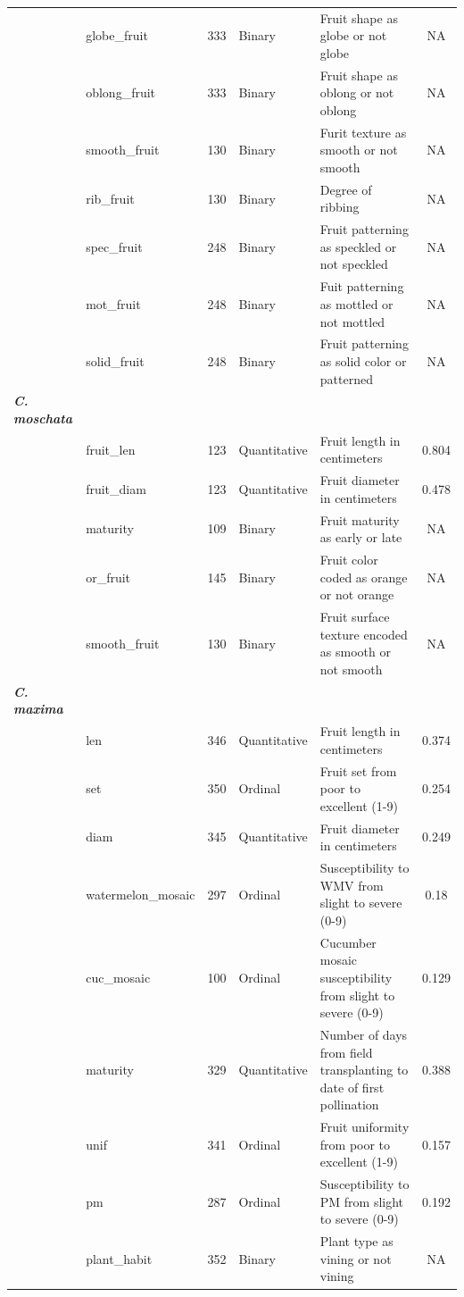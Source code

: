 \documentclass[utf8]{FrontiersinHarvard} %
\begin{document}
\begin{center}
\begin{longtable}{l l l l p{5cm} c}
& globe\_fruit & 333 &Binary & Fruit shape as globe or not globe & NA\\
& oblong\_fruit & 333&Binary & Fruit shape as oblong or not oblong & NA\\
& smooth\_fruit & 130 &Binary & Furit texture as smooth or not smooth & NA\\
& rib\_fruit & 130 &Binary & Degree of ribbing & NA \\
& spec\_fruit & 248 &Binary & Fruit patterning as speckled or not speckled & NA \\
& mot\_fruit & 248 & Binary & Fuit patterning as mottled or not mottled & NA \\
& solid\_fruit & 248& Binary & Fruit patterning as solid color or patterned & NA \\
\textbf{\emph{C. moschata}} & && & &\\
& fruit\_len & 123&Quantitative & Fruit length in centimeters & 0.804 \\
& fruit\_diam &123 &Quantitative & Fruit diameter in centimeters & 0.478 \\
& maturity & 109&Binary & Fruit maturity as early or late & NA \\
& or\_fruit & 145&Binary & Fruit color coded as orange or not orange & NA \\
& smooth\_fruit & 130 &Binary & Fruit surface texture encoded as smooth or not smooth & NA \\
\textbf{\emph{C. maxima}}& & & & &\\
& len & 346 &Quantitative & Fruit length in centimeters & 0.374\\
& set & 350 &Ordinal & Fruit set from poor to excellent (1-9) & 0.254 \\
& diam & 345 &Quantitative & Fruit diameter in centimeters & 0.249 \\
& watermelon\_mosaic & 297 &Ordinal & Susceptibility to WMV from slight to severe (0-9) &  0.18\\
& cuc\_mosaic & 100 &Ordinal & Cucumber mosaic susceptibility from slight to severe (0-9) & 0.129 \\ 
& maturity & 329 &Quantitative & Number of days from field transplanting to date of first pollination & 0.388\\
& unif & 341 &Ordinal & Fruit uniformity from poor to excellent (1-9) & 0.157 \\
& pm & 287 &Ordinal & Susceptibility to PM from slight to severe (0-9) & 0.192\\
& plant\_habit & 352 &Binary & Plant type as vining or not vining& NA \\

\end{longtable}
\end{center}
\end{document}
